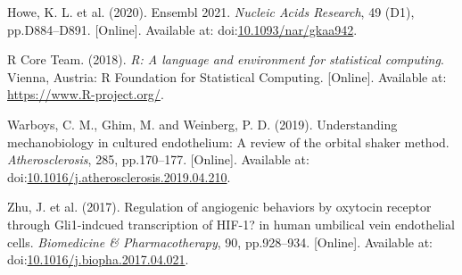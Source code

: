 \documentclass[
  12pt,
]{article}
\newlength{\cslhangindent}
\newlength{\cslentryspacingunit} %
\newenvironment{CSLReferences}[2] %
 {%
  \setlength{\parindent}{0pt}
  \ifodd #1
  \let\oldpar\par
  \def\par{\hangindent=\cslhangindent\oldpar}
  \fi
  \setlength{\parskip}{#2\cslentryspacingunit}
 }%
 {}
\begin{document}
\hypertarget{refs}{}
\begin{CSLReferences}{0}{0}
\leavevmode{}%
Howe, K. L. {et al.} (2020). {Ensembl 2021}. \emph{Nucleic Acids Research}, 49 (D1), pp.D884--D891. {[}Online{]}. Available at: doi:\href{https://doi.org/10.1093/nar/gkaa942}{10.1093/nar/gkaa942}.

\leavevmode{}%
R Core Team. (2018). {\emph{R: A language and environment for statistical computing}}. Vienna, Austria: R Foundation for Statistical Computing. {[}Online{]}. Available at: \url{https://www.R-project.org/}.

\leavevmode{}%
Warboys, C. M., Ghim, M. and Weinberg, P. D. (2019). {Understanding mechanobiology in cultured endothelium: A review of the orbital shaker method}. \emph{Atherosclerosis}, 285, pp.170--177. {[}Online{]}. Available at: doi:\href{https://doi.org/10.1016/j.atherosclerosis.2019.04.210}{10.1016/j.atherosclerosis.2019.04.210}.

\leavevmode{}%
Zhu, J. {et al.} (2017). {Regulation of angiogenic behaviors by oxytocin receptor through Gli1-indcued transcription of HIF-1? in human umbilical vein endothelial cells}. \emph{Biomedicine \& Pharmacotherapy}, 90, pp.928--934. {[}Online{]}. Available at: doi:\href{https://doi.org/10.1016/j.biopha.2017.04.021}{10.1016/j.biopha.2017.04.021}.

\end{CSLReferences}
\end{document}
